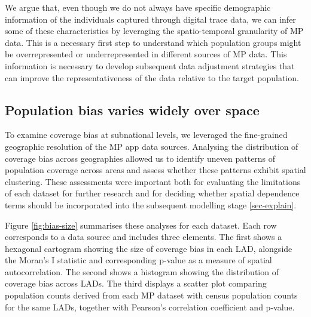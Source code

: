 \documentclass{article}
\begin{document}
We argue that, even though we do not always have specific demographic
information of the individuals captured through digital trace data, we
can infer some of these characteristics by leveraging the
spatio-temporal granularity of MP data. This is a necessary first step
to understand which population groups might be overrepresented or
underrepresented in different sources of MP data. This information is
necessary to develop subsequent data adjustment strategies that can
improve the representativeness of the data relative to the target
population.

\subsection{Population bias varies widely over space}\label{population-bias-varies-widely-over-space}

To examine coverage bias at subnational levels, we leveraged the
fine-grained geographic resolution of the MP app data sources. Analysing
the distribution of coverage bias across geographies allowed us to
identify uneven patterns of population coverage across areas and assess
whether these patterns exhibit spatial clustering. These assessments
were important both for evaluating the limitations of each dataset for
further research and for deciding whether spatial dependence terms
should be incorporated into the subsequent modelling stage
\ref{sec-explain}.

Figure \ref{fig:bias-size} summarises these analyses for each dataset.
Each row corresponds to a data source and includes three elements. The first shows a
hexagonal cartogram showing the size of coverage bias in each LAD,
alongside the Moran's I statistic and corresponding p-value as a measure
of spatial autocorrelation. The second shows a histogram showing the distribution of
coverage bias across LADs. The third displays a scatter plot comparing population
counts derived from each MP dataset with census population counts for
the same LADs, together with Pearson's correlation coefficient and
p-value.
\end{document}
